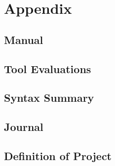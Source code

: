 
\appendix
\part{Appendix}

\chapter{Manual}

\chapter{Tool Evaluations}

\chapter{Syntax Summary}

\chapter{Journal}


\chapter{Definition of Project}
\begin{figure}[H]
\centering
\setlength\fboxsep{0pt}
\setlength\fboxrule{0.5pt}
\end{figure}
